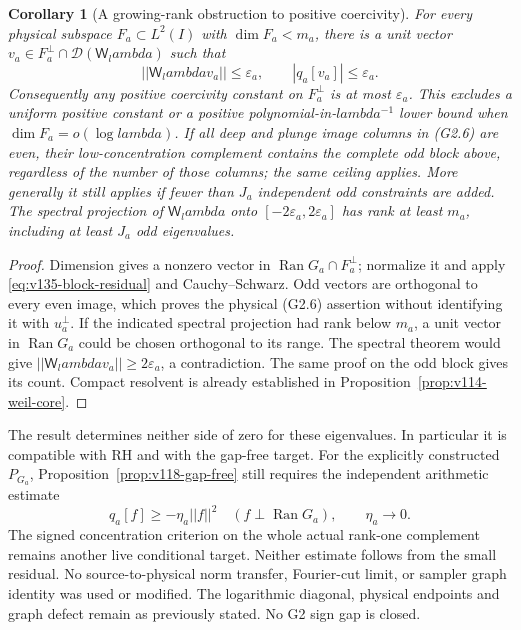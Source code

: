 \documentclass[11pt]{article}
\def\lambda{lambda}%
\def\norm#1{||#1||}%
\newtheorem{corollary}[theorem]{Corollary}
\theoremstyle{remark}
\newcommand{\norm}[1]{\left\lVert #1\right\rVert}
\begin{document}
\begin{corollary}[A growing-rank obstruction to positive coercivity]
\label{cor:v135-coercivity-obstruction}
For every physical subspace $F_a\subset L^2(I)$ with
$\dim F_a<m_a$, there is a unit vector
$v_a\in F_a^\perp\cap\mathcal D(\mathsf W_\lambda)$ such that
\begin{equation}\label{eq:v135-complement-ceiling}
 \norm{\mathsf W_\lambda v_a}\le\varepsilon_a,
 \qquad |q_a[v_a]|\le\varepsilon_a.
\end{equation}
Consequently any positive coercivity constant on $F_a^\perp$ is
at most $\varepsilon_a$.  This excludes a uniform positive constant
or a positive polynomial-in-$\lambda^{-1}$ lower bound when
$\dim F_a=o(\log\lambda)$.
If all deep and plunge image columns in (G2.6) are even, their
low-concentration complement contains the complete odd block above,
regardless of the number of those columns; the same ceiling applies.
More generally it still applies if fewer than $J_a$ independent odd
constraints are added.
The spectral projection of $\mathsf W_\lambda$ onto
$[-2\varepsilon_a,2\varepsilon_a]$ has rank at least $m_a$,
including at least $J_a$ odd eigenvalues.
\end{corollary}
\begin{proof}
Dimension gives a nonzero vector in
$\operatorname{Ran}G_a\cap F_a^\perp$; normalize it and apply
\eqref{eq:v135-block-residual} and Cauchy--Schwarz.
Odd vectors are orthogonal to every even image, which proves the
physical (G2.6) assertion without identifying it with $u_a^\perp$.
If the indicated spectral projection had rank below $m_a$, a unit
vector in $\operatorname{Ran}G_a$ could be chosen orthogonal to its
range.  The spectral theorem would give
$\norm{\mathsf W_\lambda v_a}\ge2\varepsilon_a$, a contradiction.
The same proof on the odd block gives its count. Compact resolvent
is already established in Proposition~\ref{prop:v114-weil-core}.
\end{proof}

The result determines neither side of zero for these eigenvalues.
In particular it is compatible with RH and with the gap-free target.
For the explicitly constructed $P_{G_a}$,
Proposition~\ref{prop:v118-gap-free} still requires the independent
arithmetic estimate
\[
 q_a[f]\ge-\eta_a\norm f^2\quad
 (f\perp\operatorname{Ran}G_a),\qquad \eta_a\longrightarrow0.
\]
The signed concentration criterion on the whole actual rank-one
complement remains another live conditional target.  Neither estimate
follows from the small residual.  No source-to-physical norm transfer,
Fourier-cut limit, or sampler graph identity was used or modified.
The logarithmic diagonal, physical endpoints and graph defect remain
as previously stated.  No G2 sign gap is closed.
\end{document}
